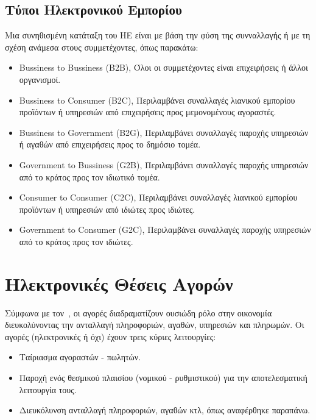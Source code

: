 \documentclass[12pt]{report}
\begin{document}
\subsection{Τύποι Ηλεκτρονικού Εμπορίου}
Μια συνηθισμένη κατάταξη του ΗΕ είναι με βάση την φύση της συνναλλαγής ή με τη σχέση ανάμεσα στους συμμετέχοντες, όπως παρακάτω:
\begin{itemize}
  \item \textlatin{Bussiness to Bussiness (B2B)}, Όλοι οι συμμετέχοντες είναι επιχειρήσεις ή άλλοι οργανισμοί.
  \item \textlatin{Bussiness to Consumer (B2C)}, Περιλαμβάνει συναλλαγές λιανικού εμπορίου προϊόντων ή υπηρεσιών από επιχειρήσεις προς μεμονομένους αγοραστές.
  \item \textlatin{Bussiness to Government (B2G)}, Περιλαμβάνει συναλλαγές παροχής υπηρεσιών ή αγαθών από επιχειρήσεις προς το δημόσιο τομέα.
  \item \textlatin{Government to Bussiness (G2B)}, Περιλαμβάνει συναλλαγές παροχής υπηρεσιών από το κράτος προς τον ιδιωτικό τομέα.
  \item \textlatin{Consumer to Consumer (C2C)}, Περιλαμβάνει συναλλαγές λιανικού εμπορίου προϊόντων ή υπηρεσιών από ιδιώτες προς ιδιώτες.
  \item \textlatin{Government to Consumer (G2C)}, Περιλαμβάνει συναλλαγές παροχής υπηρεσιών από το κράτος προς τον ιδιώτες.
\end{itemize}

\section{Ηλεκτρονικές Θέσεις Αγορών}
Σύμφωνα με τον~\cite{bakos_1998}, οι αγορές διαδραματίζουν ουσιώδη ρόλο στην οικονομία διευκολύνοντας την ανταλλαγή πληροφοριών, αγαθών, υπηρεσιών και πληρωμών. Οι αγορές (ηλεκτρονικές ή όχι) έχουν τρεις κύριες λειτουργίες:
\begin{itemize}
  \item Ταίριασμα αγοραστών - πωλητών.
  \item Παροχή ενός θεσμικού πλαισίου (νομικού - ρυθμιστικού) για την αποτελεσματική λειτουργία τους.
  \item Διευκόλυνση ανταλλαγή πληροφοριών, αγαθών κτλ, όπως αναφέρθηκε παραπάνω.
\end{itemize}
\end{document}
